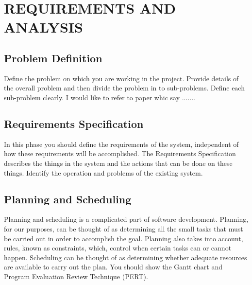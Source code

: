 
\chapter{REQUIREMENTS AND ANALYSIS} %

\label{Chapter3} %



\section{Problem Definition}
Define the problem on which you are working in the project. Provide details of the overall problem and then divide the problem in to sub-problems.
Define each sub-problem clearly. I would like to refer to \cite{kasneci2023chatgpt} paper whic say .......

\section{Requirements Specification}
In this phase you should define the requirements of the system, independent of how these requirements will be accomplished. The Requirements Specification describes the things in the system and the actions that can be done on these things. Identify the operation and problems of the existing system.

\section{Planning and Scheduling}
Planning and scheduling is a complicated part of software development. Planning, for our purposes, can be thought of as determining all the small tasks that must be carried out in order to accomplish the goal. Planning also takes into account, rules, known as constraints, which, control when certain tasks can or cannot happen. Scheduling can be thought of as determining whether adequate resources are available to carry out the plan. You should show the Gantt chart and Program Evaluation Review Technique (PERT).

